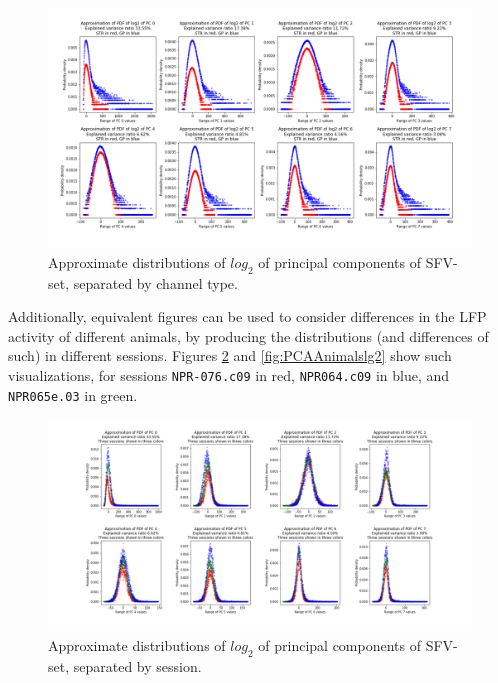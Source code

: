 \documentclass{kththesis}
\begin{document}
\begin{figure}[H]
    \centering
    \centerline{\includegraphics[width=1\textwidth]{images/PCA/PCABOTHLG2.png}}
    \caption{Approximate distributions of \begin{math}log_2\end{math} of principal components of SFV-set, separated by channel type.}
    \label{fig:PCAPDFBOTHLG2}
\end{figure}

Additionally, equivalent figures can be used to consider differences in the LFP activity of different animals, by producing the distributions (and differences of such) in different sessions.
Figures \ref{fig:PCAAnimals} and \ref{fig:PCAAnimalslg2} show such visualizations, for sessions \texttt{NPR-076.c09} in red, \texttt{NPR064.c09} in blue, and \texttt{NPR065e.03} in green.

\begin{figure}[H]
    \centering
    \centerline{\includegraphics[width=1\textwidth]{images/PCA/PCAAnimalsnormal.png}}
    \caption{Approximate distributions of \begin{math}log_2\end{math} of principal components of SFV-set, separated by session.}
    \label{fig:PCAAnimals}
\end{figure}
\end{document}
